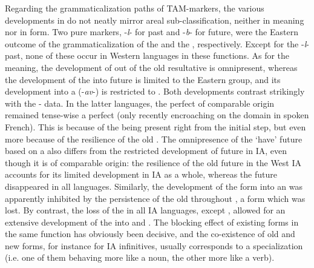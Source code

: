 \documentclass[output=paper]{langsci/langscibook}
\begin{document}
Regarding the grammaticalization paths of TAM-markers, the various developments in  do not neatly mirror areal sub-classification, neither in meaning nor in form. Two pure  markers, -\textit{l}{}- for past and -\textit{b}{}- for future, were the Eastern outcome of the grammaticalization of the  and the , respectively. Except for the  -\textit{l}{}- past, none of these occur in Western languages in these functions. As for the meaning, the development of  out of the old resultative  is omnipresent, whereas the development of the  into future is limited to the Eastern group, and its development into a   (-\textit{av}{}-) is restricted to . Both developments contrast strikingly with the - data. In the latter languages, the perfect of comparable origin remained tense-wise a perfect (only recently encroaching on the  domain in spoken French). This is because of the  being present right from the initial step, but even more because of the resilience of the old . The omnipresence of the ‘have’ future based on a   also differs from the restricted development of future in IA, even though it is of comparable origin: the resilience of the old future in the West IA accounts for its limited development in IA as a whole, whereas the  future disappeared in all  languages. Similarly, the development of the  form into an  was apparently inhibited by the persistence of the old  throughout , a form which was lost. By contrast, the loss of the  in all IA languages, except , allowed for an extensive development of the  into  and . The blocking effect of existing forms in the same function has obviously been decisive, and the co-existence of old and new forms, for instance for IA infinitives, usually corresponds to a specialization (i.e. one of them behaving more like a noun, the other more like a verb).
\end{document}

